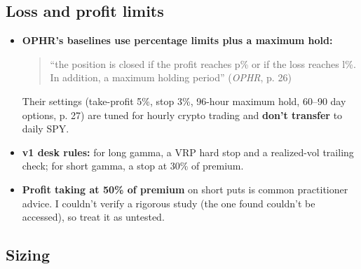 \documentclass{article}
\begin{document}
\subsection{Loss and profit limits}

\begin{itemize}

\item \textbf{OPHR's baselines use percentage limits plus a maximum hold:}

\begin{quote}``the position is closed if the profit reaches p\% or if the loss reaches l\%. In addition, a maximum holding period'' (\emph{OPHR}, p. 26)\end{quote}

Their settings (take-profit 5\%, stop 3\%, 96-hour maximum hold, 60--90 day options, p. 27) are tuned for hourly crypto trading and \textbf{don't transfer} to daily SPY.

\item \textbf{v1 desk rules:} for long gamma, a VRP hard stop and a realized-vol trailing check; for short gamma, a stop at 30\% of premium.

\item \textbf{Profit taking at 50\% of premium} on short puts is common practitioner advice. I couldn't verify a rigorous study (the one found couldn't be accessed), so treat it as untested.

\end{itemize}

\subsection{Sizing}
\end{document}
